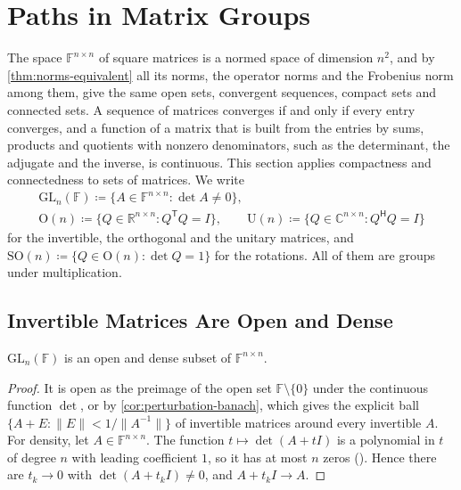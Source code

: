 \section{Paths in Matrix Groups}
\label{sec:matrix-paths}

The space $\mathbb F^{n\times n}$ of square matrices is a normed space of dimension $n^2$, and by \cref{thm:norms-equivalent} all its norms, the operator norms and the Frobenius norm among them, give the same open sets, convergent sequences, compact sets and connected sets. A sequence of matrices converges if and only if every entry converges, and a function of a matrix that is built from the entries by sums, products and quotients with nonzero denominators, such as the determinant, the adjugate and the inverse, is continuous. This section applies compactness and connectedness to sets of matrices. We write
\begin{gather*}
\mathrm{GL}_n(\mathbb F)\coloneqq\{A\in\mathbb F^{n\times n}: \det A\ne0\},\\
\mathrm O(n)\coloneqq\{Q\in\mathbb R^{n\times n}: Q^{\mathsf T}Q=I\},\qquad\mathrm U(n)\coloneqq\{Q\in\mathbb C^{n\times n}: Q^{\mathsf H}Q=I\}
\end{gather*}
for the invertible, the orthogonal and the unitary matrices, and $\mathrm{SO}(n)\coloneqq\{Q\in\mathrm O(n): \det Q=1\}$ for the rotations. All of them are groups under multiplication.

\subsection{Invertible Matrices Are Open and Dense}

\begin{proposition}
\label{prop:gl-open-dense}
$\mathrm{GL}_n(\mathbb F)$ is an open and dense subset of $\mathbb F^{n\times n}$.
\end{proposition}

\begin{proof}
It is open as the preimage of the open set $\mathbb F\setminus\{0\}$ under the continuous function $\det$, or by \cref{cor:perturbation-banach}, which gives the explicit ball $\{A+E: \|E\|<1/\|A^{-1}\|\}$ of invertible matrices around every invertible $A$. For density, let $A\in\mathbb F^{n\times n}$. The function $t\mapsto\det(A+tI)$ is a polynomial in $t$ of degree $n$ with leading coefficient $1$, so it has at most $n$ zeros (). Hence there are $t_k\to0$ with $\det(A+t_kI)\ne0$, and $A+t_kI\to A$.
\end{proof}

